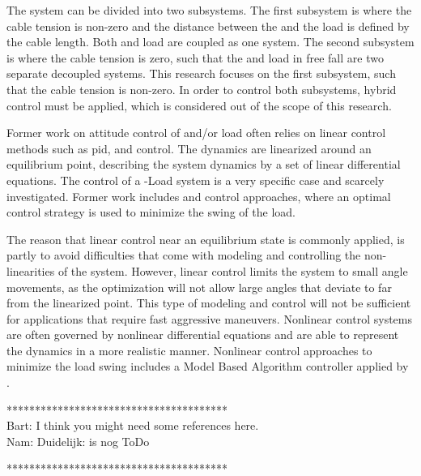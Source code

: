 The system can be divided into two subsystems. The first subsystem is where the cable tension is non-zero and the distance between the  and the load is defined by the cable length. Both  and load are coupled as one system. The second subsystem is where the cable tension is zero, such that the  and load in free fall are two separate decoupled systems. This research focuses on the first subsystem, such that the cable tension is non-zero. In order to control both subsystems, hybrid control must be applied, which is considered out of the scope of this research.

Former work on attitude control of  and/or load often relies on linear control methods such as \acs{pid},  and  control. The dynamics are linearized around an equilibrium point, describing the system dynamics by a set of linear differential equations. 
The control of a -Load system is a very specific case and scarcely investigated. Former work includes  \cite{PraveenThesis} and  control approaches, where an optimal control strategy is used to minimize the swing of the load. 

The reason that linear control near an equilibrium state is commonly applied, is partly to avoid difficulties that come with modeling and controlling the non-linearities of the system. However, linear control limits the system to small angle movements, as the optimization will not allow large angles that deviate to far from the linearized point.  
This type of modeling and control will not be sufficient for applications that require fast aggressive maneuvers.
Nonlinear control systems are often governed by nonlinear differential equations and are able to represent the dynamics in a more realistic manner. Nonlinear control approaches to minimize the load swing includes a Model Based Algorithm controller applied by \cite{Sadr2014}. 

***************************************\\
Bart: I think you might need some references here.\\
Nam: Duidelijk: is nog ToDo

***************************************\\

